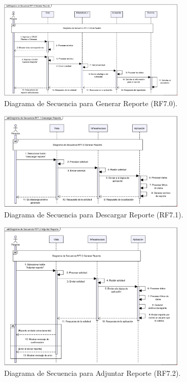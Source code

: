 \begin{figure}[H]
	\centering
		\caption{Diagrama de Secuencia para Generar Reporte (RF7.0).}
	\includegraphics[width=0.8\textwidth]{UML/Secuencia/Diagrama de Secuencia RF7.0 Generar Reporte.png}
\end{figure}


\begin{figure}[H]
	\centering
	\caption{Diagrama de Secuencia para Descargar Reporte (RF7.1).}
 \includegraphics[width=0.8\textwidth]{UML/Secuencia/Diagrama de Secuencia RF7.1 Descargar Reporte.png}
\end{figure}


\begin{figure}[H]
	\centering
		\caption{Diagrama de Secuencia para Adjuntar Reporte (RF7.2).}
	\includegraphics[width=0.8\textwidth]{UML/Secuencia/Diagrama de Secuencia RF7.2 Adjuntar Reporte.png}
\end{figure}


